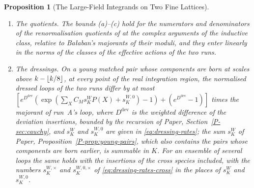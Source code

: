 \documentclass[11pt]{preprint}
\DeclarePairedDelimiter{\floor}{\lfloor}{\rfloor}
\numberwithin{equation}{section}
\newtheorem{proposition}{Proposition}
\theoremstyle{definition}
\theoremstyle{remark}
\theoremstyle{plain}
\begin{document}
\begin{proposition}[The Large-Field Integrands on Two Fine Lattices]
\begin{enumerate}[label=(\alph*)]
\item \emph{The quotients.} The bounds (a)--(c) hold for the numerators and denominators of the renormalisation quotients of \cite[(1.1), (1.2), p.~356]{BalabanLFR2} at the complex arguments of the inductive class, relative to Ba{\l}aban's majorants of their moduli, and they enter linearly in the norms of the classes of the effective actions of the two runs.
\item \emph{The dressings.} On a young matched pair whose components are born at scales above $k - \floor{k/8}$, at every point of the real integration region, the normalised dressed loops of the two runs differ by at most $[e^{D^{\mathrm{dev}}}(\exp(\sum_XC_Ms^W_KP(X) + s^{W,0}_K) - 1) + (e^{D^{\mathrm{dev}}} - 1)]$ times the majorant of run~A's loop, where $D^{\mathrm{dev}}$ is the weighted difference of the deviation insertions, bounded by the recursion of Paper, Section~\ref{P-sec:cauchy}, and $s^W_K$ and $s^{W,0}_K$ are given in \eqref{eq:dressing-rates}; the sum $s^W_K$ of Paper, Proposition~\ref{P-prop:young-pairs}, which also contains the pairs whose components are born earlier, is summable in $K$. For an ensemble of several loops the same holds with the insertions of the cross species included, with the numbers $s^{W,\times}_K$ and $s^{W,0,\times}_K$ of \eqref{eq:dressing-rates-cross} in the places of $s^W_K$ and $s^{W,0}_K$.
\end{enumerate}
\end{proposition}
\end{document}

